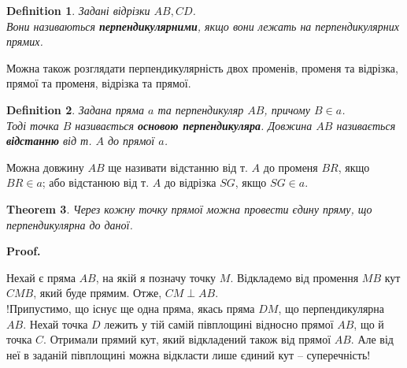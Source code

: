 \documentclass[a4paper, 10pt]{article}
\makeatletter
\def\qed{$\blacksquare$}
\theoremstyle{theoremdd}
\newtheorem{theorem}{Theorem}[subsection]
\theoremstyle{theoremdd}
\theoremstyle{theoremdd}
\newtheorem{definition}[theorem]{Definition}
\theoremstyle{theoremdd}
\theoremstyle{theoremdd}
\theoremstyle{theoremdd}
\theoremstyle{theoremdd}
\theoremstyle{theoremdd}
\theoremstyle{theoremdd}
\renewenvironment{proof}[1][Proof.\\]{\par
\pushQED{\hfill \qed}%
\normalfont \topsep6\p@\@plus6\p@\relax
\trivlist
\item\relax
{\bfseries
#1\@addpunct{.}}\hspace\labelsep\ignorespaces
}{%
\popQED\endtrivlist\@endpefalse
}
\makeatother
\begin{document}
\begin{definition} Задані відрізки $AB,CD$.\\
Вони називаються \textbf{перпендикулярними}, якщо вони лежать на перпендикулярних прямих.
\begin{figure}[H]
\centering
{}
\end{figure}
\end{definition}
Можна також розглядати перпендикулярність двох променів, променя та відрізка, прямої та променя, відрізка та прямої.

\begin{definition}
Задана пряма $a$ та перпендикуляр $AB$, причому $B \in a$.\\
Тоді точка $B$ називається \textbf{основою перпендикуляра}. Довжина $AB$ називається \textbf{відстанню} від т. $A$ до прямої $a$.
\begin{figure}[H]
\centering
{}
\end{figure}
\end{definition}
Можна довжину $AB$ ще називати відстанню від т. $A$ до променя $BR$, якщо $BR \in a$; або відстанюю від т. $A$ до відрізка $SG$, якщо $SG \in a$.

\begin{theorem}
Через кожну точку прямої можна провести єдину пряму, що перпендикулярна до даної.
\end{theorem}

\begin{proof}
Нехай є пряма $AB$, на якій я позначу точку $M$. Відкладемо від промення $MB$ кут $CMB$, який буде прямим. Отже, $CM \perp AB$.\\
!Припустимо, що існує ще одна пряма, якась пряма $DM$, що перпендикулярна $AB$. Нехай точка $D$ лежить у тій самій півплощині відносно прямої $AB$, що й точка $C$. Отримали прямий кут, який відкладений також від прямої $AB$. Але від неї в заданій півплощині можна відкласти лише єдиний кут -- суперечність!
\end{proof}
\newpage
\end{document}
